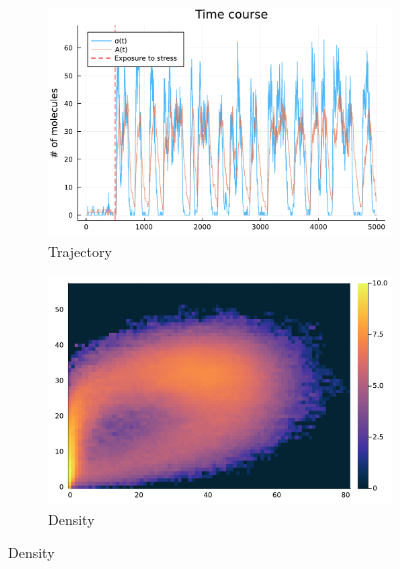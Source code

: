 \begin{figure}
    \centering
    \begin{subfigure}{0.45\textwidth}
        \centering
        \includegraphics[width=\textwidth]{Figs/2_5_algo_example_traj.pdf}
        \caption{Trajectory}
    \end{subfigure}
    \hfill
    \begin{subfigure}{0.45\textwidth}
        \centering
        \includegraphics[width=\textwidth]{Figs/2_5_algo_example_density.pdf}
        \caption{Density}
    \end{subfigure}
    

\end{figure}
